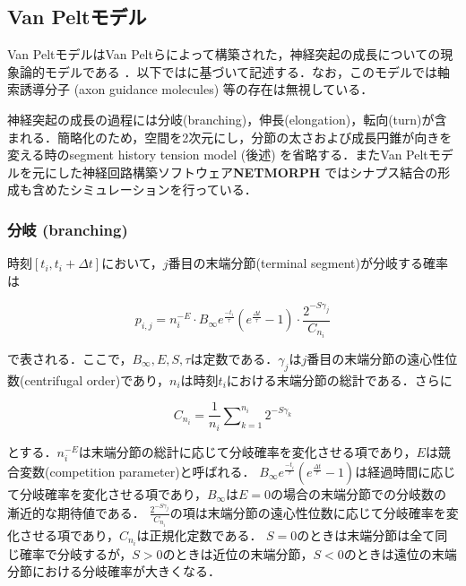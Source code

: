 \subsection{Van Peltモデル}
Van PeltモデルはVan Peltらによって構築された，神経突起の成長についての現象論的モデルである \citep{Van_Pelt2002-vm}．以下では\citep{Koene2009-hv}に基づいて記述する．なお，このモデルでは軸索誘導分子 (axon guidance molecules) 等の存在は無視している．

神経突起の成長の過程には分岐(branching)，伸長(elongation)，転向(turn)が含まれる．簡略化のため，空間を2次元にし，分節の太さおよび成長円錐が向きを変える時のsegment history tension model (後述) を省略する．またVan Peltモデルを元にした神経回路構築ソフトウェア\textbf{NETMORPH} \citep{Koene2009-hv}ではシナプス結合の形成も含めたシミュレーションを行っている．

\subsubsection{分岐 (branching)}
時刻$[t_i, t_i + \Delta t]$において，$j$番目の末端分節(terminal segment)が分岐する確率は


\begin{equation}
p_{i,j} = n_i^{-E}\cdot B_{\infty} e^{\frac{-t_i}{\tau}} \left(e^{\frac{\Delta t}{\tau}} - 1\right)\cdot \frac{2^{-S\gamma_j}}{C_{n_i}}
\end{equation}


で表される．ここで，$B_{\infty}, E, S, \tau$は定数である．$\gamma_j$は$j$番目の末端分節の遠心性位数(centrifugal order)であり，$n_i$は時刻$t_i$における末端分節の総計である．さらに


\begin{equation}
{C_{n_i}} = \frac{1}{n_i}\sum\nolimits_{k = 1}^{n_i} {{2^{ - S{\gamma_k}}}}
\end{equation}


とする．$n_i^{-E}$は末端分節の総計に応じて分岐確率を変化させる項であり，$E$は競合変数(competition parameter)と呼ばれる．
$B_{\infty} e^{\frac{-t_i}{\tau}} \left(e^{\frac{\Delta t}{\tau}} - 1\right)$は経過時間に応じて分岐確率を変化させる項であり，$B_{\infty}$は$E=0$の場合の末端分節での分岐数の漸近的な期待値である．
$\frac{2^{-S\gamma_j}}{C_{n_i}}$の項は末端分節の遠心性位数に応じて分岐確率を変化させる項であり，$C_{n_i}$は正規化定数である．
$S=0$のときは末端分節は全て同じ確率で分岐するが，$S>0$のときは近位の末端分節，$S<0$のときは遠位の末端分節における分岐確率が大きくなる．

